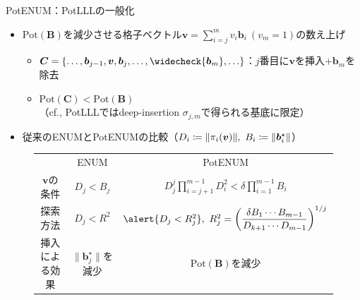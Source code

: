 \documentclass[12pt,aspectratio=169,xcolor=dvipsnames,table,dvipdfmx, leqno]{beamer}
\newcommand{\bhline}{\noalign{\hrule height 1.0pt}}
\begin{document}
\begin{frame}{PotENUM：PotLLLの一般化}
\begin{itemize}
\item $\mathrm{Pot}(\bm{B})$を減少させる格子ベクトル$\bm{v} = \sum_{i=j}^m v_i \bm{b}_i~(v_m = 1)$の数え上げ
    \begin{itemize}
    \item $\bm{C} = \{\ldots, \bm{b}_{j-1}, \bm{v}, \bm{b}_j,\ldots, \widecheck{\bm{b}_m}, \ldots \}$：$j$番目に$\bm{v}$を挿入+$\bm{b}_m$を除去
    \item $\mathrm{Pot}(\bm{C}) < \mathrm{Pot}(\bm{B})$ \\
    （cf., PotLLL\cite{FSW14}ではdeep-insertion $\sigma_{j, m}$で得られる基底に限定）
    \end{itemize}
\item 従来のENUM\cite{GNR10}とPotENUMの比較（$D_i\coloneq \norm{\pi_i(\bm{v})},~B_i\coloneq\norm{\bm{b}_i^\star}$）
\end{itemize}
\begin{figure}[htbp]
    \begin{table}[]
        \centering
        \begin{tabular}{c|c|c}
             & ENUM\cite{GNR10} & PotENUM\\
            \bhline
            $\bm{v}$の条件 & $D_j<B_j$ &\alert{$\displaystyle D_j^j \prod_{i=j+1}^{m-1}D_i^2<\delta\prod_{i=1}^{m-1}B_i$}\\
            \hline
            探索方法 & $D_j<R^2$ & $\alert{D_j<R_j^2},~R_j^2=\qty(\dfrac{\delta B_1\cdots B_{m-1}}{D_{k+1}\cdots D_{m-1}})^{1/j}$\\
            \hline
            挿入による効果 & $\| \bm{b}_j^\star \|$を減少 & \alert{$\mathrm{Pot}(\bm{B})$を減少} 
        \end{tabular}
        \label{tab:my_label}
    \end{table}
\end{figure}
\end{frame}
\end{document}
